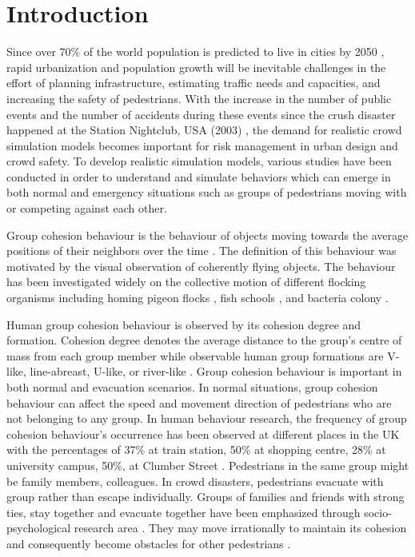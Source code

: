 \documentclass[a4paper,11pt,phdthesis,singlespace,twoside]{cssethesis}
\begin{document}
\mainmatter						%

\chapter{Introduction}
\let\cleardoublepage\clearpage
Since over 70\% of the world population is predicted to live in cities by 2050 \cite{Weidmann2012}, rapid urbanization and population growth will be inevitable challenges in the effort of planning infrastructure, estimating traffic needs and capacities, and increasing the safety of pedestrians. With the increase in the number of public events and the number of accidents during these events since the crush disaster happened at the Station Nightclub, USA (2003) \cite{Evers2011}, the demand for realistic crowd simulation models becomes important for risk management in urban design and crowd safety. To develop realistic simulation models, various studies have been conducted in order to understand and simulate behaviors which can emerge in both normal and emergency situations such as groups of pedestrians moving with or competing against each other.

Group cohesion behaviour is the behaviour of objects moving towards the average positions of their neighbors over the time \cite{Reynolds1987}. The definition of this behaviour was motivated by the visual observation of coherently flying objects. The behaviour has been investigated widely on the collective motion of different flocking organisms including homing pigeon flocks \cite{Kattas2012}, fish schools \cite{Miller2013}, and bacteria colony \cite{Cisneros2007}. 

Human group cohesion behaviour is observed by its cohesion degree and formation. Cohesion degree denotes the average distance to the group’s centre of mass from each group member while observable human group formations are V-like, line-abreast, U-like, or river-like \cite {Helbing2005}. Group cohesion behaviour is important in both normal and evacuation scenarios. In normal situations, group cohesion behaviour can affect the speed and movement direction of pedestrians who are not belonging to any group. In human behaviour research, the frequency of group cohesion behaviour’s occurrence has been observed at different places in the UK with the percentages of 37\% at train station, 50\% at shopping centre, 28\% at university campus, 50\%, at Clumber Street \cite{Singh2009}. Pedestrians in the same group might be family members, colleagues. In crowd disasters, pedestrians evacuate with group rather than escape individually. Groups of families and friends with strong ties, stay together and evacuate together have been emphasized through socio-psychological research area \cite {Mawson2005}. They may move irrationally to maintain its cohesion and consequently become obstacles for other pedestrians \cite{Aguirre2011}.
\end{document}
